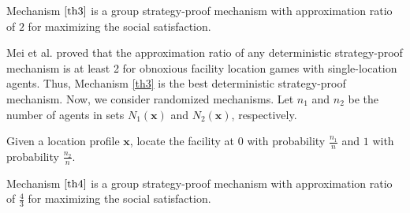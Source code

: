 \documentclass[runningheads]{11llncst}
\begin{document}
\begin{theorem}
    Mechanism $\ref{th3}$ is a group strategy-proof mechanism with approximation ratio of $2$ for maximizing the social satisfaction. 
\end{theorem}



Mei et al. \cite{mei2019facility} proved that the approximation ratio of any deterministic strategy-proof mechanism is at least 2 for obnoxious facility location games with single-location agents. Thus, Mechanism \ref{th3} is the best deterministic strategy-proof mechanism. Now, we consider randomized mechanisms. Let $n_1$ and $n_2$ be the number of agents in sets $N_1(\textbf{x})$ and $N_2(\textbf{x})$, respectively.

\begin{mechanism} \label{th4}
    Given a location profile $\textbf{x}$, locate the facility at  $0$ with probability $\frac{n_1}{n}$ and $1$ with probability $\frac{n_2}{n}$. 
\end{mechanism}

\begin{theorem}\label{th7}
	Mechanism $\ref{th4}$ is a group strategy-proof mechanism with approximation ratio of $\frac{4}{3}$ for maximizing the social satisfaction. 
\end{theorem}
\end{document}
